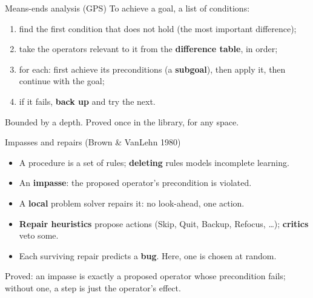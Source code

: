 \documentclass[aspectratio=169,11pt]{beamer}
\begin{document}
\begin{frame}{Means-ends analysis (GPS)}
  To achieve a goal, a list of conditions:
  \begin{enumerate}
    \item find the first condition that does not hold (the most important difference);
    \item take the operators relevant to it from the \textbf{difference table}, in order;
    \item for each: first achieve its preconditions (a \textbf{subgoal}), then apply it, then continue with the goal;
    \item if it fails, \textbf{back up} and try the next.
  \end{enumerate}
  \medskip
  Bounded by a depth. Proved once in the library, for any space.
\end{frame}

\begin{frame}{Impasses and repairs (Brown \& VanLehn 1980)}
  \begin{itemize}
    \item A procedure is a set of rules; \textbf{deleting} rules models incomplete learning.
    \item An \textbf{impasse}: the proposed operator's precondition is violated.
    \item A \textbf{local} problem solver repairs it: no look-ahead, one action.
    \item \textbf{Repair heuristics} propose actions (Skip, Quit, Backup, Refocus, \dots); \textbf{critics} veto some.
    \item Each surviving repair predicts a \textbf{bug}. Here, one is chosen at random.
  \end{itemize}
  \medskip
  Proved: an impasse is exactly a proposed operator whose precondition fails; without one, a step is just the operator's effect.
\end{frame}
\end{document}
